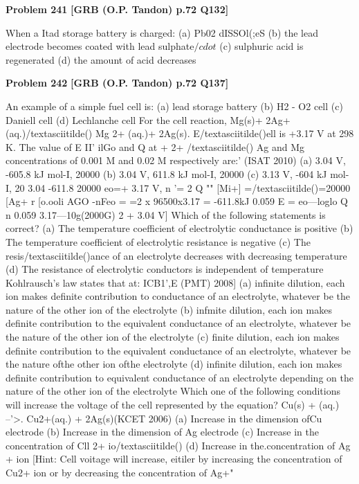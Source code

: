 \begin{problembox}
\textbf{Problem 241} \hfill \textbf{[GRB (O.P. Tandon) p.72 Q132]}
\label{q:ext-grb_all_questions-241}

When a Itad storage battery is charged: 
(a) Pb02 dISSOl(;eS 
(b) the lead electrode becomes coated with lead sulphate$/cdot$ 
(c) sulphuric acid is regenerated 
(d) the amount of acid decreases
\end{problembox}

\begin{problembox}
\textbf{Problem 242} \hfill \textbf{[GRB (O.P. Tandon) p.72 Q137]}
\label{q:ext-grb_all_questions-242}

An example of a simple fuel cell is: 
(a) lead storage battery 
(b) H2 -
O2 cell 
(c) Daniell cell 
(d) Lechlanche cell 
For the cell reaction, 
Mg(s)+ 2Ag+(aq.)/textasciitilde() Mg 2+ (aq.)+ 2Ag(s). 
E/textasciitilde()ell is +3.17 V at 298 K. The value of E II' ilGo and Q at 
+ 
2+ 
/textasciitilde() 
Ag 
and Mg 
concentrations of 0.001 M and 0.02 M 
respectively are:' 
(ISAT 2010) 
(a) 3.04 V, -605.8 kJ mol-I, 20000 
(b) 3.04 V, 611.8 kJ mol-I, 20000 
(c) 3.13 V, -604 kJ mol-I, 20 
3.04 
-611.8 
20000 
eo=+ 3.17 V, n '= 2 
Q "" [Mi+] =/textasciitilde()=20000 
[Ag+ r [o.ooli 
AGO -nFeo 
= =2 x 96500x3.17 
= -611.8kJ 
0.059 
E = eo---loglo Q 
n 
0.059 
3.17---10g(2000G) 
2 
+ 3.04 V] 
Which of the following statements is correct? 
(a) The temperature coefficient of electrolytic conductance is 
positive 
(b) The temperature coefficient of electrolytic resistance is 
negative 
(c) The resis/textasciitilde()ance of an electrolyte decreases with decreasing 
temperature 
(d) The resistance of electrolytic conductors is independent of 
temperature 
Kohlrausch's law states that at: 
ICB1',E (PMT) 2008] 
(a) infinite dilution, each ion makes definite contribution to 
conductance of an electrolyte, whatever be the nature of 
the other ion of the electrolyte 
(b) infmite dilution, each ion makes definite contribution to 
the equivalent conductance of an electrolyte, whatever be 
the nature of the other ion of the electrolyte 
(c) finite dilution, each ion makes definite contribution to the 
equivalent conductance of an electrolyte, whatever be the 
nature ofthe other ion ofthe electrolyte 
(d) infinite dilution, each ion makes definite contribution to 
equivalent conductance of an electrolyte depending on the 
nature of the other ion of the electrolyte 
Which one of the following conditions will increase the 
voltage of the cell represented by the equation? 
Cu(s) + 
(aq.) --'>. Cu2+(aq.) + 2Ag(s)(KCET 2006) 
(a) Increase in the dimension ofCu electrode 
(b) Increase in the dimension of Ag electrode 
(c) Increase in the concentration of Cll 2+ io/textasciitilde() 
(d) Increase in the.concentration of Ag + ion 
[Hint: 
Cell voitage will increase, eitiler by increasing the 
concentration of Cu2+ ion or by decreasing the concentration of 
Ag+"
\end{problembox}

